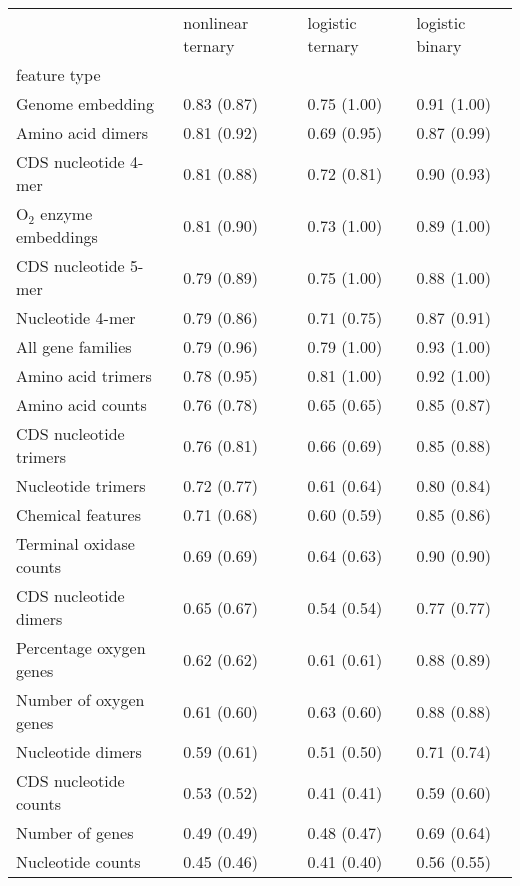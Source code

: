 \begin{tabular}{llll}
\toprule
 & nonlinear ternary & logistic ternary & logistic binary \\
feature type &  &  &  \\
\midrule
Genome embedding & 0.83 (0.87) & 0.75 (1.00) & 0.91 (1.00) \\
Amino acid dimers & 0.81 (0.92) & 0.69 (0.95) & 0.87 (0.99) \\
CDS nucleotide 4-mer & 0.81 (0.88) & 0.72 (0.81) & 0.90 (0.93) \\
O$_2$ enzyme embeddings & 0.81 (0.90) & 0.73 (1.00) & 0.89 (1.00) \\
CDS nucleotide 5-mer & 0.79 (0.89) & 0.75 (1.00) & 0.88 (1.00) \\
Nucleotide 4-mer & 0.79 (0.86) & 0.71 (0.75) & 0.87 (0.91) \\
All gene families & 0.79 (0.96) & 0.79 (1.00) & 0.93 (1.00) \\
Amino acid trimers & 0.78 (0.95) & 0.81 (1.00) & 0.92 (1.00) \\
Amino acid counts & 0.76 (0.78) & 0.65 (0.65) & 0.85 (0.87) \\
CDS nucleotide trimers & 0.76 (0.81) & 0.66 (0.69) & 0.85 (0.88) \\
Nucleotide trimers & 0.72 (0.77) & 0.61 (0.64) & 0.80 (0.84) \\
Chemical features & 0.71 (0.68) & 0.60 (0.59) & 0.85 (0.86) \\
Terminal oxidase counts & 0.69 (0.69) & 0.64 (0.63) & 0.90 (0.90) \\
CDS nucleotide dimers & 0.65 (0.67) & 0.54 (0.54) & 0.77 (0.77) \\
Percentage oxygen genes & 0.62 (0.62) & 0.61 (0.61) & 0.88 (0.89) \\
Number of oxygen genes & 0.61 (0.60) & 0.63 (0.60) & 0.88 (0.88) \\
Nucleotide dimers & 0.59 (0.61) & 0.51 (0.50) & 0.71 (0.74) \\
CDS nucleotide counts & 0.53 (0.52) & 0.41 (0.41) & 0.59 (0.60) \\
Number of genes & 0.49 (0.49) & 0.48 (0.47) & 0.69 (0.64) \\
Nucleotide counts & 0.45 (0.46) & 0.41 (0.40) & 0.56 (0.55) \\
\bottomrule
\end{tabular}
